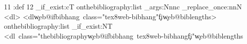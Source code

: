 \def\web@ifbibhang{\ifdim\dimexpr\leftmargin+\itemindent-1sp\relax<\z@}
\def\web@biblengths{ style="--tex8web-bibitem-sep: \web@bodyem{\dimexpr\itemsep+\parsep\relax};
    \web@ifbibhang
        --tex8web-bibhang: \web@bodyem\leftmargin; --tex8web-bibitemindent: \web@bodyem\itemindent"%
    \else
        --tex8web-biblabelsep: \web@bodyem{\ifdefined\biblabelsep\biblabelsep\else\web@biblabelsep\fi}"%
    \fi}
\def\web@biblabelsep{\labelsep}
 11
\ifdefined\@openbib@code \pend:def\@openbib@code{\edef\web@biblabelsep{\the\labelsep}}\fi
{} 12
\ExplSyntaxOn
\cs_if_exist:cT { onthebibliography:list }
    { \exp_args:Nnnc \regex_replace_once:nnN { <dl> } { <dl\c{web@ifbibhang}\ class="tex8web-bibhang"\c{fi}\c{web@biblengths}> } { onthebibliography:list } }
\cs_if_exist:NT \bibConfigure
    { \web@replace {} { <dl\ class="thebibliography\c{web@ifbibhang}\ tex8web-bibhang\c{fi}"\c{web@biblengths} } }
\ExplSyntaxOff


